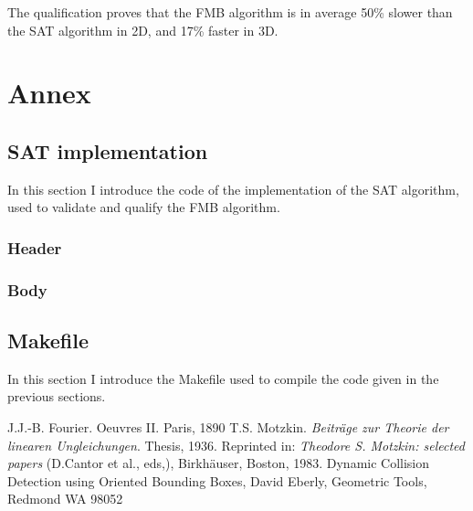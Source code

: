 \documentclass[12pt, a4paper]{article}
\begin{document}
The qualification proves that the FMB algorithm is in average 50\% slower than the SAT algorithm in 2D, and 17\% faster in 3D.\\

\section{Annex}

\subsection{SAT implementation}
\label{sat_implementation}

In this section I introduce the code of the implementation of the SAT algorithm, used to validate and qualify the FMB algorithm.\\

\subsubsection{Header}

\begin{scriptsize}
\begin{ttfamily}

\end{ttfamily}
\end{scriptsize}

\subsubsection{Body}

\begin{scriptsize}
\begin{ttfamily}

\end{ttfamily}
\end{scriptsize}

\subsection{Makefile}

In this section I introduce the Makefile used to compile the code given in the previous sections.\\

\begin{scriptsize}
\begin{ttfamily}

\end{ttfamily}
\end{scriptsize}

\begin{thebibliography}{9}
 J.J.-B. Fourier. Oeuvres II. Paris, 1890
 T.S. Motzkin. {\em Beitr\"{a}ge zur Theorie der linearen Ungleichungen}. Thesis, 1936. Reprinted in: {\em Theodore S. Motzkin: selected papers} (D.Cantor et al., eds,), Birkh\"{a}user, Boston, 1983.
 Dynamic Collision Detection using Oriented Bounding
Boxes, David Eberly, Geometric Tools, Redmond WA 98052
\end{thebibliography}
\end{document}
